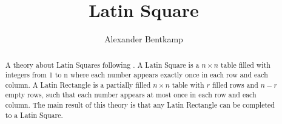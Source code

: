 \documentclass[11pt,a4paper]{article}
\begin{document}
\title{Latin Square}
\author{Alexander Bentkamp}
\maketitle

\begin{abstract}
  A theory about Latin Squares following \cite{aigner}. A Latin Square is a $n \times n$ table filled with
  integers from 1 to n where each number appears exactly once in each row and each column. A Latin Rectangle
  is a partially filled $n \times n$ table with $r$ filled rows and $n-r$ empty rows, such that each number
  appears at most once in each row and each column. The main result of this theory is that any Latin Rectangle
  can be completed to a Latin Square.
\end{abstract}

\tableofcontents





\end{document}
